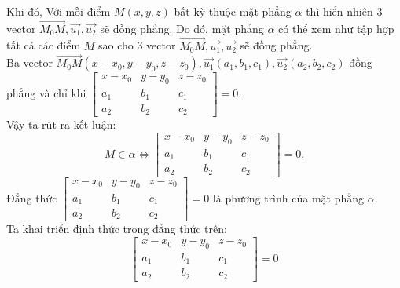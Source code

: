 \documentclass[12pt,a4]{article}
\begin{document}
\begin{titlepage}
\begin{center}
\end{center}
Khi đó, Với mỗi điểm $M(x,y,z)$ bất kỳ thuộc mặt phẳng $\alpha$ thì hiển nhiên 3 vector $\overrightarrow{M_0M}, \vec{u_1}, \vec{u_2}$ sẽ đồng phẳng. Do đó, mặt phẳng $\alpha$ có thể xem như tập hợp tất cả các điểm $M$ sao cho 3 vector $\overrightarrow{M_0M}, \vec{u_1}, \vec{u_2}$ sẽ đồng phẳng.\\
Ba vector $\overrightarrow{M_0M}(x - x_0, y - y_0, z - z_0), \vec{u_1}(a_1,b_1,c_1), \vec{u_2}(a_2,b_2,c_2)$ đồng phẳng và chỉ khi $\begin{bmatrix}
x - x_0 &y - y_0& z - z_0\\ a_1 &b_1 &c_1\\a_2&b_2&c_2
\end{bmatrix} = 0.$\\
Vậy ta rút ra kết luận:
\[
M \in \alpha \Leftrightarrow \begin{bmatrix}x - x_0 &y - y_0& z - z_0\\ a_1 &b_1 &c_1\\a_2&b_2&c_2 \end{bmatrix} = 0.
\]
Đẳng thức $\begin{bmatrix}x - x_0 &y - y_0& z - z_0\\ a_1 &b_1 &c_1\\a_2&b_2&c_2 \end{bmatrix} = 0$ là phương trình của mặt phẳng $\alpha$.\\
Ta khai triển định thức trong đẳng thức trên:
\[
    \begin{bmatrix}x - x_0 &y - y_0& z - z_0\\ a_1 &b_1 &c_1\\a_2&b_2&c_2 \end{bmatrix} = 0
\]
\end{titlepage}
\end{document}
